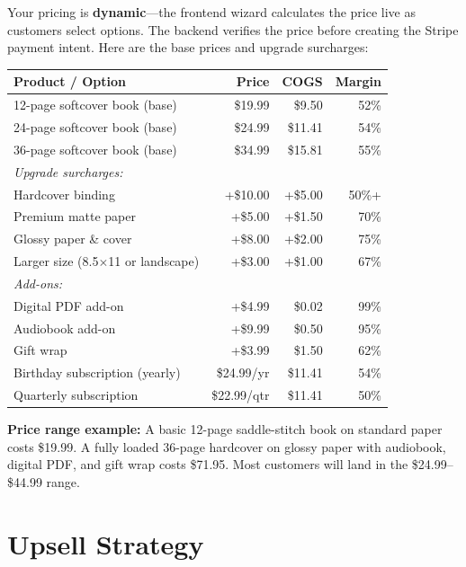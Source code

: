 \documentclass[12pt, letterpaper, oneside]{book}
\begin{document}
Your pricing is \textbf{dynamic}---the frontend wizard calculates the price live as customers select options. The backend verifies the price before creating the Stripe payment intent. Here are the base prices and upgrade surcharges:

\begin{table}[H]
\centering
\begin{tabularx}{\textwidth}{Xrrr}
\toprule
\textbf{Product / Option} & \textbf{Price} & \textbf{COGS} & \textbf{Margin} \\
\midrule
12-page softcover book (base) & \$19.99 & \$9.50 & 52\% \\
24-page softcover book (base) & \$24.99 & \$11.41 & 54\% \\
36-page softcover book (base) & \$34.99 & \$15.81 & 55\% \\
\midrule
\textit{Upgrade surcharges:} & & & \\
\quad Hardcover binding & +\$10.00 & +\$5.00 & 50\%+ \\
\quad Premium matte paper & +\$5.00 & +\$1.50 & 70\% \\
\quad Glossy paper \& cover & +\$8.00 & +\$2.00 & 75\% \\
\quad Larger size (8.5$\times$11 or landscape) & +\$3.00 & +\$1.00 & 67\% \\
\midrule
\textit{Add-ons:} & & & \\
\quad Digital PDF add-on & +\$4.99 & \$0.02 & 99\% \\
\quad Audiobook add-on & +\$9.99 & \$0.50 & 95\% \\
\quad Gift wrap & +\$3.99 & \$1.50 & 62\% \\
\midrule
Birthday subscription (yearly) & \$24.99/yr & \$11.41 & 54\% \\
Quarterly subscription & \$22.99/qtr & \$11.41 & 50\% \\
\bottomrule
\end{tabularx}
\end{table}

\begin{successbox}
\textbf{Price range example:} A basic 12-page saddle-stitch book on standard paper costs \$19.99. A fully loaded 36-page hardcover on glossy paper with audiobook, digital PDF, and gift wrap costs \$71.95. Most customers will land in the \$24.99--\$44.99 range.
\end{successbox}

\section{Upsell Strategy}
\end{document}
